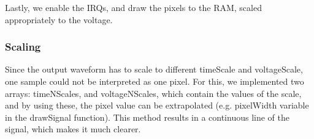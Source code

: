 \documentclass[12pt,oneside,letterpaper]{article}
\begin{document}


Lastly, we enable the IRQs, and draw the pixels to the RAM, scaled appropriately to the voltage.



\subsubsection{Scaling}
Since the output waveform has to scale to different timeScale and voltageScale, one sample could not be interpreted as one pixel. For this, we implemented two arrays: timeNScales, and voltageNScales, which contain the values of the scale, and by using these, the pixel value can be extrapolated (e.g. pixelWidth variable in the drawSignal function). This method results in a continuous line of the signal, which makes it much clearer.
\end{document}
